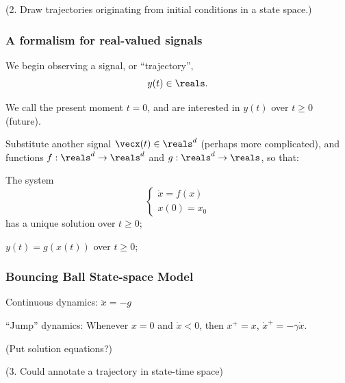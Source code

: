 \documentclass[12pt]{beamer}
\begin{document}
\begin{frame}

(2. Draw trajectories originating from initial conditions in a state space.)

\end{frame}




\begin{frame}
\frametitle{A formalism for real-valued signals}

\begin{itemize}
\vitem We begin observing a signal, or ``trajectory'',
\[
y(t) \in \reals.
\]

\vitem We call the present moment $t=0$, and are interested in $y(t)$ over $t \geq 0$ (future).


\vitem Substitute another signal $\vecx(t) \in \reals^d$ (perhaps more complicated), and functions $f : \reals^d \to \reals^d$ and $g : \reals^d \to \reals$, so that:

\begin{enumerate}
\vitem The system
\[
\begin{cases}
	\dot x = f(x) \\
	x(0) = x_0
\end{cases}
\]
has a unique solution over $t \geq 0$;

\vitem $y(t) = g( x(t) )$ over $t \geq 0$;


\end{enumerate}

\end{itemize}

\vfill\null
\end{frame}



\begin{frame}
\frametitle{Bouncing Ball State-space Model}

Continuous dynamics: $\ddot x = -g$

``Jump'' dynamics: Whenever $x = 0$ and $\dot x < 0$, then
$x^+ = x$, $\dot x^+ = -\gamma \dot x$.

(Put solution equations?)

(3. Could annotate a trajectory in state-time space)



\end{frame}
\end{document}
